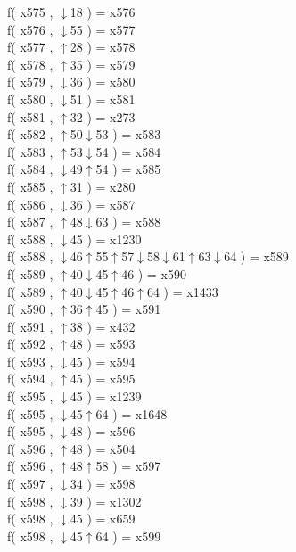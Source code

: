 f( x575 , $\downarrow$18 ) = x576 \\
f( x576 , $\downarrow$55 ) = x577 \\
f( x577 , $\uparrow$28 ) = x578 \\
f( x578 , $\uparrow$35 ) = x579 \\
f( x579 , $\downarrow$36 ) = x580 \\
f( x580 , $\downarrow$51 ) = x581 \\
f( x581 , $\uparrow$32 ) = x273 \\
f( x582 , $\uparrow$50$\downarrow$53 ) = x583 \\
f( x583 , $\uparrow$53$\downarrow$54 ) = x584 \\
f( x584 , $\downarrow$49$\uparrow$54 ) = x585 \\
f( x585 , $\uparrow$31 ) = x280 \\
f( x586 , $\downarrow$36 ) = x587 \\
f( x587 , $\uparrow$48$\downarrow$63 ) = x588 \\
f( x588 , $\downarrow$45 ) = x1230 \\
f( x588 , $\downarrow$46$\uparrow$55$\uparrow$57$\downarrow$58$\downarrow$61$\uparrow$63$\downarrow$64 ) = x589 \\
f( x589 , $\uparrow$40$\downarrow$45$\uparrow$46 ) = x590 \\
f( x589 , $\uparrow$40$\downarrow$45$\uparrow$46$\uparrow$64 ) = x1433 \\
f( x590 , $\uparrow$36$\uparrow$45 ) = x591 \\
f( x591 , $\uparrow$38 ) = x432 \\
f( x592 , $\uparrow$48 ) = x593 \\
f( x593 , $\downarrow$45 ) = x594 \\
f( x594 , $\uparrow$45 ) = x595 \\
f( x595 , $\downarrow$45 ) = x1239 \\
f( x595 , $\downarrow$45$\uparrow$64 ) = x1648 \\
f( x595 , $\downarrow$48 ) = x596 \\
f( x596 , $\uparrow$48 ) = x504 \\
f( x596 , $\uparrow$48$\uparrow$58 ) = x597 \\
f( x597 , $\downarrow$34 ) = x598 \\
f( x598 , $\downarrow$39 ) = x1302 \\
f( x598 , $\downarrow$45 ) = x659 \\
f( x598 , $\downarrow$45$\uparrow$64 ) = x599 \\

